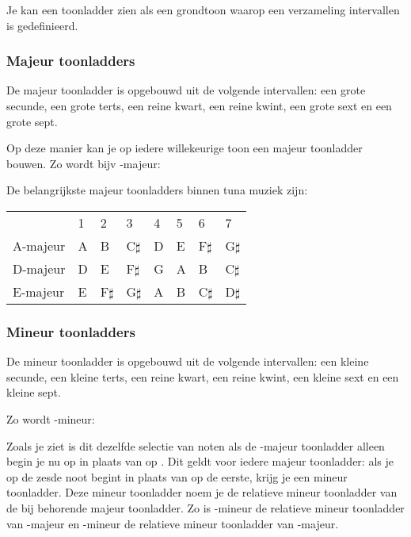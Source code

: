 Je kan een toonladder zien als een grondtoon waarop een verzameling intervallen is gedefinieerd.

\subsubsection*{Majeur toonladders}
De majeur toonladder is opgebouwd uit de volgende intervallen: een grote secunde, een grote terts, een reine kwart, een reine kwint, een grote sext en een grote sept. 

Op deze manier kan je op iedere willekeurige toon een majeur toonladder bouwen. Zo wordt bijv -majeur:

      

De belangrijkste majeur toonladders binnen tuna muziek zijn:

\begin{tabular}{l l l l l l l l}
           &1  &2  &3  &4  &5  &6  &7\\
A-majeur	&A  &B  &C$\sharp$ &D  &E  &F$\sharp$ &G$\sharp$\\
D-majeur	&D  &E  &F$\sharp$ &G  &A  &B  &C$\sharp$\\
E-majeur	&E  &F$\sharp$ &G$\sharp$ &A  &B  &C$\sharp$ &D$\sharp$
\end{tabular}

\subsubsection*{Mineur toonladders}
De mineur toonladder is opgebouwd uit de volgende intervallen: een kleine secunde, een kleine terts, een reine kwart, een reine kwint, een kleine sext en een kleine sept.

Zo wordt -mineur:

      

Zoals je ziet is dit dezelfde selectie van noten als de -majeur toonladder alleen begin je nu op  in plaats van op . Dit geldt voor iedere majeur toonladder: als je op de zesde noot begint in plaats van op de eerste, krijg je een mineur toonladder. Deze mineur toonladder noem je de relatieve mineur toonladder van de bij behorende majeur toonladder. Zo is -mineur de relatieve mineur toonladder van -majeur en -mineur de relatieve mineur toonladder van -majeur.

